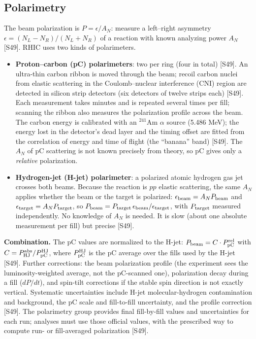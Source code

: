 \documentclass[11pt,letterpaper]{article}
\begin{document}
\subsection{Polarimetry}
The beam polarization is $P=\epsilon/A_N$: measure a left--right asymmetry $\epsilon=(N_L-N_R)/(N_L+N_R)$ of a reaction with known
analyzing power $A_N$ [S49]. RHIC uses two kinds of polarimeters.
\begin{itemize}
\item \textbf{Proton--carbon (pC) polarimeters}: two per ring (four in total) [S49]. An ultra-thin carbon ribbon is moved
through the beam; recoil carbon nuclei from elastic scattering in the Coulomb--nuclear interference (CNI) region are detected in
silicon strip detectors (six detectors of twelve strips each) [S49]. Each measurement takes minutes and is repeated
several times per fill; scanning the ribbon also measures the polarization profile across the beam. The carbon energy is
calibrated with an $^{241}$Am $\alpha$ source (5.486 MeV); the energy lost in the detector's dead layer and the timing offset
are fitted from the correlation of energy and time of flight (the ``banana'' band) [S49]. The $A_N$ of pC scattering is not
known precisely from theory, so pC gives only a \emph{relative} polarization.
\item \textbf{Hydrogen-jet (H-jet) polarimeter}: a polarized atomic hydrogen gas jet crosses both beams. Because the reaction
is $pp$ elastic scattering, the same $A_N$ applies whether the beam or the target is polarized:
$\epsilon_{\rm beam}=A_NP_{\rm beam}$ and $\epsilon_{\rm target}=A_NP_{\rm target}$, so
$P_{\rm beam}=P_{\rm target}\,\epsilon_{\rm beam}/\epsilon_{\rm target}$, with $P_{\rm target}$ measured independently.
No knowledge of $A_N$ is needed. It is slow (about one absolute measurement per fill) but precise [S49].
\end{itemize}
\textbf{Combination.} The pC values are normalized to the H-jet: $P_{\rm beam}=C\cdot P_{\rm pC}^{\rm rel}$ with
$C=P^{\rm abs}_{\rm HJ}/P^{\rm HJ}_{\rm pC}$, where $P^{\rm HJ}_{\rm pC}$ is the pC average over the fills used by the H-jet [S49].
Further corrections: the beam polarization profile (the experiment sees the luminosity-weighted average, not the
pC-scanned one), polarization decay during a fill ($dP/dt$), and spin-tilt corrections if the stable spin direction is not
exactly vertical. Systematic uncertainties include H-jet molecular-hydrogen contamination and background, the pC scale and
fill-to-fill uncertainty, and the profile correction [S49]. The polarimetry group provides final fill-by-fill values and
uncertainties for each run; analyses must use those official values, with the prescribed way to compute run- or
fill-averaged polarization [S49].
\end{document}
